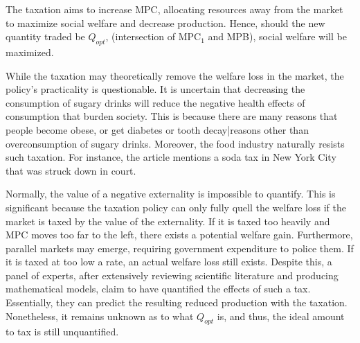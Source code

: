 \documentclass[12pt]{article}
\begin{document}
\begin{center}
	
\end{center}

The taxation aims to increase MPC, allocating resources away from the market to maximize social welfare and decrease production. Hence, should the new quantity traded be $Q_{opt}$, (intersection of $\textrm{MPC}_1$ and MPB), social welfare will be maximized.

\vspace{\baselineskip}

While the taxation may theoretically remove the welfare loss in the market, the policy\rq s practicality is questionable. It is  uncertain that decreasing the consumption of sugary drinks will reduce the negative health effects of consumption that burden society. This is because there are many reasons that people become obese, or get diabetes or tooth decay|reasons other than overconsumption of sugary drinks. Moreover, the food industry naturally resists such taxation. For instance, the article mentions a soda tax in New York City that was struck down in court.


\vspace{\baselineskip}

Normally, the value of a negative externality is impossible to quantify. This is significant because the taxation policy can only fully quell the welfare loss if the market is taxed by the value of the externality. If it is taxed too heavily and MPC moves too far to the left, there exists a potential welfare gain. Furthermore, parallel markets may emerge, requiring government expenditure to police them. If it is taxed at too low a rate, an actual welfare loss still exists. Despite this, a panel of experts, after extensively reviewing scientific literature and producing mathematical models, claim to have quantified the effects of such a tax. Essentially, they can predict the resulting reduced production with the taxation. Nonetheless, it remains unknown as to what $Q_{opt}$ is, and thus, the ideal amount to tax is still unquantified.
\end{document}
